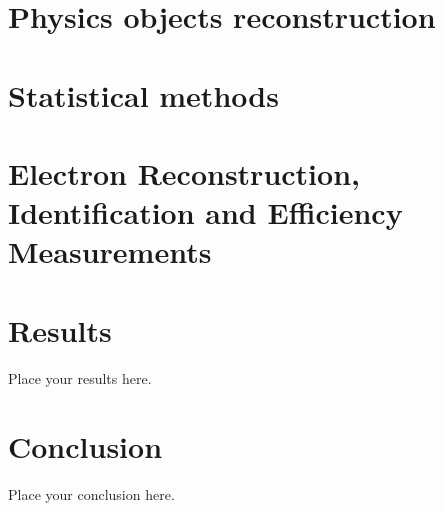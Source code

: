 \documentclass[11pt,twoside]{book}
\begin{document}
\chapter{Physics objects reconstruction}
\label{chap:object_rec}


\chapter{Statistical methods}
\label{chap:stats}


\chapter{Electron Reconstruction, Identification and Efficiency Measurements}
\label{chap:electrons}


\chapter{Results}
\label{chap:result}

Place your results here.



\chapter{Conclusion}
\label{chap:conclusion}

Place your conclusion here.
\end{document}
